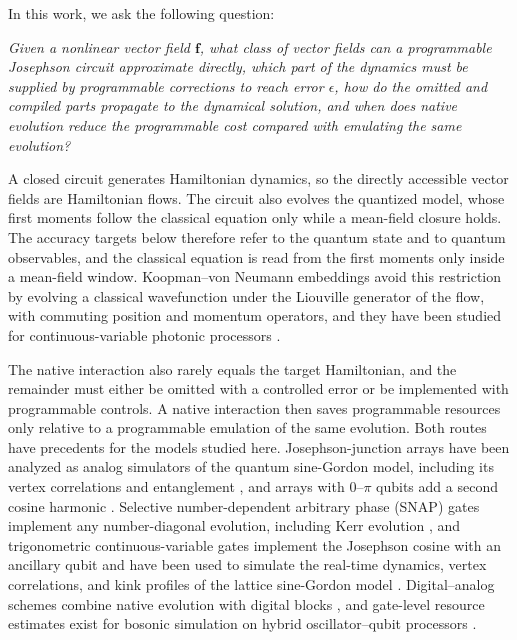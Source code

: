 \documentclass[pra,twocolumn,superscriptaddress,nofootinbib,floatfix]{revtex4-2}
\theoremstyle{remark}
\begin{document}
In this work, we ask the following question:

\emph{Given a nonlinear vector field \(\mathbf f\), what class of vector fields can a programmable Josephson circuit approximate directly, which part of the dynamics must be supplied by programmable corrections to reach error \(\epsilon\), how do the omitted and compiled parts propagate to the dynamical solution, and when does native evolution reduce the programmable cost compared with emulating the same evolution?}

A closed circuit generates Hamiltonian dynamics, so the directly accessible vector fields are Hamiltonian flows. The circuit also evolves the quantized model, whose first moments follow the classical equation only while a mean-field closure holds. The accuracy targets below therefore refer to the quantum state and to quantum observables, and the classical equation is read from the first moments only inside a mean-field window. Koopman--von Neumann embeddings avoid this restriction by evolving a classical wavefunction under the Liouville generator of the flow, with commuting position and momentum operators, and they have been studied for continuous-variable photonic processors \cite{gao2025implementingkoopmanvonneumannapproach}.

The native interaction also rarely equals the target Hamiltonian, and the remainder must either be omitted with a controlled error or be implemented with programmable controls. A native interaction then saves programmable resources only relative to a programmable emulation of the same evolution. Both routes have precedents for the models studied here. Josephson-junction arrays have been analyzed as analog simulators of the quantum sine-Gordon model, including its vertex correlations and entanglement \cite{Roy2021}, and arrays with \(0\)--\(\pi\) qubits add a second cosine harmonic \cite{RoyLukyanov2023Confinement,Roy2023Multicritical}. Selective number-dependent arbitrary phase (SNAP) gates implement any number-diagonal evolution, including Kerr evolution \cite{Krastanov_2015,Heeres_2015}, and trigonometric continuous-variable gates implement the Josephson cosine with an ancillary qubit and have been used to simulate the real-time dynamics, vertex correlations, and kink profiles of the lattice sine-Gordon model \cite{Rainaldi2026TrigonometricCV}. Digital--analog schemes combine native evolution with digital blocks \cite{ParraRodriguez2020DAQC,DigitalAnalogFermionBoson2025}, and gate-level resource estimates exist for bosonic simulation on hybrid oscillator--qubit processors \cite{Crane2024Hybrid}.
\end{document}

